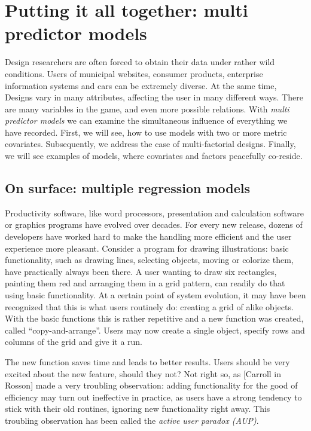 \documentclass[]{svmono}
\theoremstyle{definition}
\theoremstyle{definition}
\theoremstyle{definition}
\theoremstyle{remark}
\begin{document}
\section{Putting it all together: multi predictor
models}\label{putting-it-all-together-multi-predictor-models}

Design researchers are often forced to obtain their data under rather
wild conditions. Users of municipal websites, consumer products,
enterprise information systems and cars can be extremely diverse. At the
same time, Designs vary in many attributes, affecting the user in many
different ways. There are many variables in the game, and even more
possible relations. With \emph{multi predictor models} we can examine
the simultaneous influence of everything we have recorded. First, we
will see, how to use models with two or more metric covariates.
Subsequently, we address the case of multi-factorial designs. Finally,
we will see examples of models, where covariates and factors peacefully
co-reside.

\subsection{On surface: multiple regression
models}\label{on-surface-multiple-regression-models}

Productivity software, like word processors, presentation and
calculation software or graphics programs have evolved over decades. For
every new release, dozens of developers have worked hard to make the
handling more efficient and the user experience more pleasant. Consider
a program for drawing illustrations: basic functionality, such as
drawing lines, selecting objects, moving or colorize them, have
practically always been there. A user wanting to draw six rectangles,
painting them red and arranging them in a grid pattern, can readily do
that using basic functionality. At a certain point of system evolution,
it may have been recognized that this is what users routinely do:
creating a grid of alike objects. With the basic functions this is
rather repetitive and a new function was created, called
``copy-and-arrange''. Users may now create a single object, specify rows
and columns of the grid and give it a run.

The new function saves time and leads to better results. Users should be
very excited about the new feature, should they not? Not right so, as
{[}Carroll in Rosson{]} made a very troubling observation: adding
functionality for the good of efficiency may turn out ineffective in
practice, as users have a strong tendency to stick with their old
routines, ignoring new functionality right away. This troubling
observation has been called the \emph{active user paradox (AUP)}.
\end{document}

